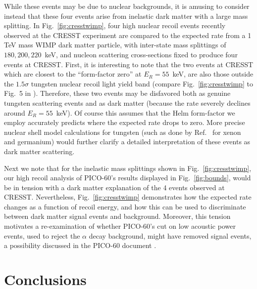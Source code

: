 \documentclass[11pt]{article}
\begin{document}
While these events may be due to nuclear backgrounds, it is amusing to consider instead that these four events
arise from inelastic dark matter with a large mass
splitting. In Fig.~\ref{fig:cresstwimp}, four high nuclear recoil events recently observed at the CRESST experiment are compared to the expected rate from a 1 TeV mass WIMP dark matter particle, with inter-state mass splittings of $180,200,220$~keV, and nucleon scattering cross-sections fixed to produce four events at CRESST. First, it is interesting to note that the two events at CRESST which are closest to the ``form-factor zero'' at $E_R=55$~keV, are also those outside the $1.5\sigma$ tungsten nuclear recoil light yield band (compare Fig.~\ref{fig:cresstwimp} to Fig.~5 in \cite{Angloher:2015ewa}). Therefore, these two events may be disfavored both as genuine tungsten scattering events and as dark matter (because the rate severely declines around $E_R=55$~keV). Of course this assumes that the Helm form-factor we employ accurately predicts where the expected rate drops to zero.  More precise nuclear shell model calculations for tungsten (such as done by Ref.~\cite{Klos:2013rwa,Vietze:2014vsa} for xenon and germanium) would further clarify a detailed interpretation of these events as dark matter scattering.

Next we note that for the inelastic mass splittings shown in Fig.~\ref{fig:cresstwimp}, our high recoil analysis of PICO-60's results displayed in Fig.~\ref{fig:bounds}, would be in tension with a dark matter explanation of the 4 events observed at CRESST. Nevertheless, Fig.~\ref{fig:cresstwimp} demonstrates how the expected rate changes as a function of recoil energy, and how this can be used to discriminate between dark matter signal events and background. Moreover, this tension motivates a re-examination of whether PICO-60's cut on low acoustic power events, used to reject the  $\alpha$ decay background, might have removed signal events, a possibility discussed in the PICO-60 document \cite{Amole:2015pla}.



\section{Conclusions} 
\label{sec:conclusions}
\end{document}
